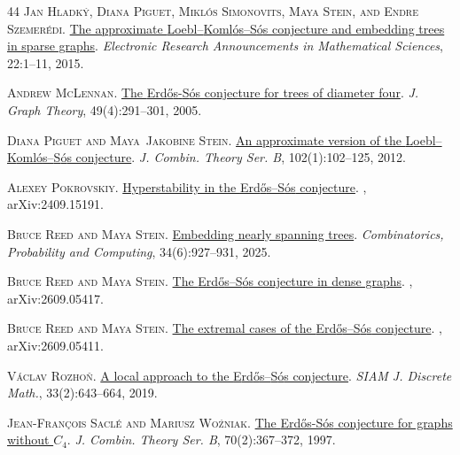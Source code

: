 \documentclass[a4paper,11pt]{article}
\begin{document}
\begin{thebibliography}{44}
\textsc{Jan Hladk{\'y}, Diana Piguet, Mikl{\'o}s Simonovits, Maya Stein, and
  Endre Szemer{\'e}di}.
\newblock \href{https://doi.org/10.3934/era.2015.22.1}{The approximate
  {L}oebl--{K}oml{\'o}s--{S}{\'o}s conjecture and embedding trees in sparse
  graphs}.
\newblock \emph{Electronic Research Announcements in Mathematical Sciences},
  22:1--11, 2015.

\textsc{Andrew McLennan}.
\newblock \href{https://doi.org/10.1002/jgt.20083}{The {Erd{\H{o}}s}-{S}\'os
  conjecture for trees of diameter four}.
\newblock \emph{J. Graph Theory}, 49(4):291--301, 2005.

\textsc{Diana Piguet and Maya~Jakobine Stein}.
\newblock \href{https://doi.org/10.1016/j.jctb.2011.05.002}{An approximate
  version of the {L}oebl--{K}oml{\'o}s--{S}{\'o}s conjecture}.
\newblock \emph{J. Combin. Theory Ser. B}, 102(1):102--125, 2012.

\textsc{Alexey Pokrovskiy}.
\newblock \href{https://arxiv.org/abs/2409.15191}{Hyperstability in the
  {Erd{\H{o}}s--S{\'o}s} conjecture}.
, arXiv:2409.15191.

\textsc{Bruce Reed and Maya Stein}.
\newblock \href{https://doi.org/10.1017/S0963548325100084}{Embedding nearly
  spanning trees}.
\newblock \emph{Combinatorics, Probability and Computing}, 34(6):927--931,
  2025.

\textsc{Bruce Reed and Maya Stein}.
\newblock \href{https://arxiv.org/abs/2609.05417}{The {Erd{\H{o}}s--S{\'o}s}
  conjecture in dense graphs}.
, arXiv:2609.05417.

\textsc{Bruce Reed and Maya Stein}.
\newblock \href{https://arxiv.org/abs/2609.05411}{The extremal cases of the
  {Erd{\H{o}}s--S{\'o}s} conjecture}.
, arXiv:2609.05411.

\textsc{V{\'a}clav Rozho{\v{n}}}.
\newblock \href{https://doi.org/10.1137/18M118195X}{A local approach to the
  {E}rd{\H{o}}s--{S}{\'o}s conjecture}.
\newblock \emph{SIAM J. Discrete Math.}, 33(2):643--664, 2019.

\textsc{Jean-François Saclé and Mariusz Woźniak}.
\newblock \href{https://doi.org/10.1006/jctb.1997.1758}{The {Erd\H{o}s-S{\'o}s}
  conjecture for graphs without {$C_4$}}.
\newblock \emph{J. Combin. Theory Ser. B}, 70(2):367--372, 1997.


\end{thebibliography}
\end{document}
